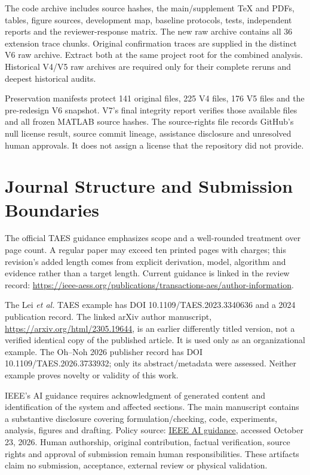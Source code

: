 \documentclass[10pt,journal]{IEEEtran}
\begin{document}
The code archive includes source hashes, the main/supplement TeX and PDFs, tables, figure sources, development map, baseline protocols, tests, independent reports and the reviewer-response matrix. The new raw archive contains all 36 extension trace chunks. Original confirmation traces are supplied in the distinct V6 raw archive. Extract both at the same project root for the combined analysis. Historical V4/V5 raw archives are required only for their complete reruns and deepest historical audits.

Preservation manifests protect 141 original files, 225 V4 files, 176 V5 files and the pre-redesign V6 snapshot. V7's final integrity report verifies those available files and all frozen MATLAB source hashes. The source-rights file records GitHub's null license result, source commit lineage, assistance disclosure and unresolved human approvals. It does not assign a license that the repository did not provide.

\section{Journal Structure and Submission Boundaries}
The official TAES guidance emphasizes scope and a well-rounded treatment over page count. A regular paper may exceed ten printed pages with charges; this revision's added length comes from explicit derivation, model, algorithm and evidence rather than a target length. Current guidance is linked in the review record: \url{https://ieee-aess.org/publications/transactions-aes/author-information}.

The Lei \emph{et al.} TAES example has DOI 10.1109/TAES.2023.3340636 and a 2024 publication record. The linked arXiv author manuscript, \url{https://arxiv.org/html/2305.19644}, is an earlier differently titled version, not a verified identical copy of the published article. It is used only as an organizational example. The Oh--Noh 2026 publisher record has DOI 10.1109/TAES.2026.3733932; only its abstract/metadata were assessed. Neither example proves novelty or validity of this work.

IEEE's AI guidance requires acknowledgment of generated content and identification of the system and affected sections. The main manuscript contains a substantive disclosure covering formulation/checking, code, experiments, analysis, figures and drafting. Policy source: \href{https://open.ieee.org/author-guidelines-for-artificial-intelligence-ai-generated-text/}{IEEE AI guidance}, accessed October 23, 2026. Human authorship, original contribution, factual verification, source rights and approval of submission remain human responsibilities. These artifacts claim no submission, acceptance, external review or physical validation.
\end{document}
